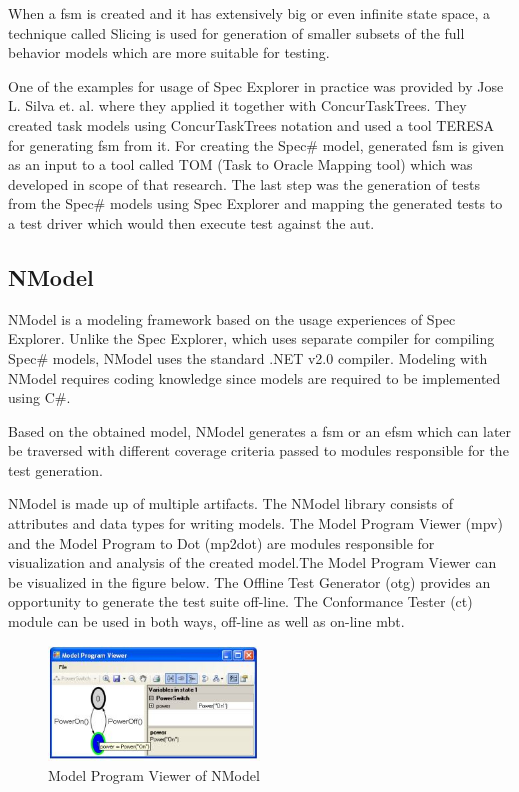 \par
When a \acrshort{fsm} is created and it has extensively big or even infinite state space, a technique called Slicing is used for generation of smaller subsets of the full behavior models which are more suitable for testing.

\par
One of the examples for usage of Spec Explorer in practice was provided by Jose L. Silva et. al. \cite{Silva_SpecExplorer} where they applied it together with ConcurTaskTrees. They created task models using ConcurTaskTrees notation
and used a tool TERESA for generating \acrshort{fsm} from it. For creating the Spec\# model, generated \acrshort{fsm} is given as an input to a tool called TOM (Task to Oracle Mapping tool) which was developed in scope of that research. The last step was the generation of tests from the Spec\# models using Spec Explorer and mapping the generated tests to a test driver which would then execute test against the \acrshort{aut}.

\subsection{NModel}
\par
NModel \cite{NModel_Description} \cite{NModel_Description2} is a modeling framework based on the usage experiences of Spec Explorer. Unlike the Spec Explorer, which uses separate compiler for compiling Spec\# models, NModel uses the standard .NET v2.0 compiler. Modeling with NModel requires coding knowledge since models are required to be implemented using C\#.

\par
Based on the obtained model, NModel generates a \acrshort{fsm} or an \acrshort{efsm} which can later be traversed with different coverage criteria passed to modules responsible for the test generation.

\par
NModel is made up of multiple artifacts. The NModel library consists of attributes and data types for writing models. The Model Program Viewer (mpv) and the Model Program to Dot (mp2dot) are modules responsible for visualization and analysis of the created model.The Model Program Viewer can be visualized in the figure below. The Offline Test Generator (otg) provides an opportunity to generate the test suite off-line. The Conformance Tester (ct) module can be used in both ways, off-line as well as on-line \acrshort{mbt}.

\begin{figure} [htbp!]
	\centering
					\includegraphics[width=0.5\textwidth]{figures/NModel_mpv.JPG}
					\caption{\label{Fig:NModel_mpv} Model Program Viewer of NModel}
\end{figure}


